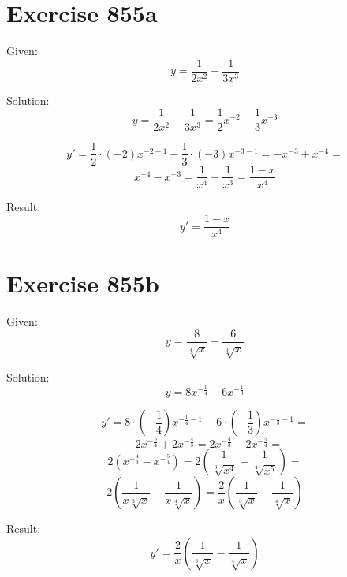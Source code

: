 \documentclass[a4paper, 10pt]{scrartcl}
\begin{document}
\section{Exercise 855a}

Given:
\[
y = \frac{1}{2x^{2}} - \frac{1}{3x^{3}}
\]

Solution:
\[
y = \frac{1}{2x^{2}} - \frac{1}{3x^{3}} = \frac{1}{2}x^{-2} - \frac{1}{3}x^{-3}
\]

\[
y' = \frac{1}{2}\cdot(-2)x^{-2 - 1} - \frac{1}{3}\cdot(-3)x^{-3 - 1} = -x^{-3} + x^{-4} =
\]
\[
x^{-4} - x^{-3} = \frac{1}{x^{4}} - \frac{1}{x^{3}} = \frac{1 - x}{x^{4}}
\]

Result:
\[
y' = \frac{1 - x}{x^{4}}
\]

\section{Exercise 855b}

Given:
\[
y = \frac{8}{\sqrt[4]{x}} - \frac{6}{\sqrt[3]{x}}
\]

Solution:
\[
y = 8x^{-\frac{1}{4}} - 6x^{-\frac{1}{3}}
\]

\[
y' = 8\cdot(-\frac{1}{4})x^{-\frac{1}{4} - 1} - 6\cdot(-\frac{1}{3})x^{-\frac{1}{3} - 1} =
\]
\[
-2x^{-\frac{5}{4}} + 2x^{-\frac{4}{3}} = 2x^{-\frac{4}{3}} - 2x^{-\frac{5}{4}} =
\]
\[
2\left(x^{-\frac{4}{3}} - x^{-\frac{5}{4}}\right) = 2\left(\frac{1}{\sqrt[3]{x^{4}}} - \frac{1}{\sqrt[4]{x^{5}}}\right) =
\]
\[
2\left(\frac{1}{x\sqrt[3]{x}} - \frac{1}{x\sqrt[4]{x}}\right) = \frac{2}{x}\left(\frac{1}{\sqrt[3]{x}} - \frac{1}{\sqrt[4]{x}}\right)
\]

Result:
\[
y' = \frac{2}{x}\left(\frac{1}{\sqrt[3]{x}} - \frac{1}{\sqrt[4]{x}}\right)
\]
\end{document}
